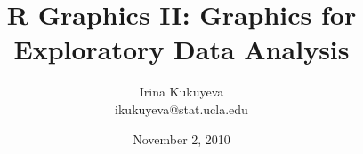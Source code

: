 \title{ \ttfamily R \normalfont Graphics II: Graphics for Exploratory Data Analysis}
\author{Irina Kukuyeva \\ \ttfamily ikukuyeva@stat.ucla.edu \normalfont}
\date{November 2, 2010}



\frame{ \titlepage }
